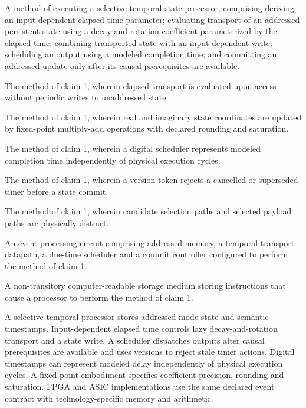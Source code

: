 \documentclass[pct]{sm-patent}
\begin{document}
\begin{patentclaims}

\item A method of executing a selective temporal-state processor, comprising deriving an input-dependent elapsed-time parameter; evaluating transport of an addressed persistent state using a decay-and-rotation coefficient parameterized by the elapsed time; combining transported state with an input-dependent write; scheduling an output using a modeled completion time; and committing an addressed update only after its causal prerequisites are available.

\item The method of claim 1, wherein elapsed transport is evaluated upon access without periodic writes to unaddressed state.

\item The method of claim 1, wherein real and imaginary state coordinates are updated by fixed-point multiply-add operations with declared rounding and saturation.

\item The method of claim 1, wherein a digital scheduler represents modeled completion time independently of physical execution cycles.

\item The method of claim 1, wherein a version token rejects a cancelled or superseded timer before a state commit.

\item The method of claim 1, wherein candidate selection paths and selected payload paths are physically distinct.

\item An event-processing circuit comprising addressed memory, a temporal transport datapath, a due-time scheduler and a commit controller configured to perform the method of claim 1.

\item A non-transitory computer-readable storage medium storing instructions that cause a processor to perform the method of claim 1.

\end{patentclaims}

\abstractstart

A selective temporal processor stores addressed mode state and semantic timestamps. Input-dependent elapsed time controls lazy decay-and-rotation transport and a state write. A scheduler dispatches outputs after causal prerequisites are available and uses versions to reject stale timer actions. Digital timestamps can represent modeled delay independently of physical execution cycles. A fixed-point embodiment specifies coefficient precision, rounding and saturation. FPGA and ASIC implementations use the same declared event contract with technology-specific memory and arithmetic.
\end{document}
